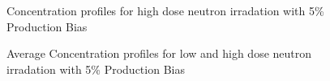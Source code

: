 \documentclass[a4paper]{article}
\begin{document}
\begin{figure}[htb!]
      \caption{Concentration profiles for high dose neutron irradation with 5\% Production Bias}
      \label{figure:concentrations_neutron_5_1e-3}
    \end{figure}

    \begin{figure}[h!]  %
      \centering
      \qquad
      \caption{Average Concentration profiles for low and high dose neutron irradation with 5\% Production Bias}
      \label{figure:average_concentrations_neutron_5}
    \end{figure}
\end{document}
